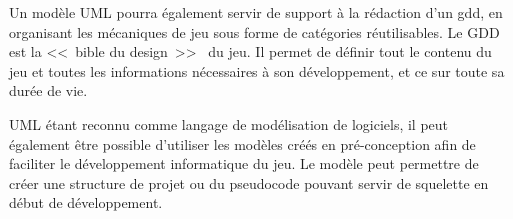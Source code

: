 Un modèle UML pourra également servir de support à la rédaction d'un \gls{gdd}, en organisant les mécaniques de jeu sous forme de catégories réutilisables.
Le GDD est la <<~bible du design~>>~\cite{GD_foundations_pedersen} du jeu.
Il permet de définir tout le contenu du jeu et toutes les informations nécessaires à son développement, et ce sur toute sa durée de vie. 

UML étant reconnu comme langage de modélisation de logiciels, il peut également être possible d'utiliser les modèles créés en pré-conception afin de faciliter le développement informatique du jeu.
Le modèle peut permettre de créer une structure de projet ou du pseudocode pouvant servir de squelette en début de développement.


